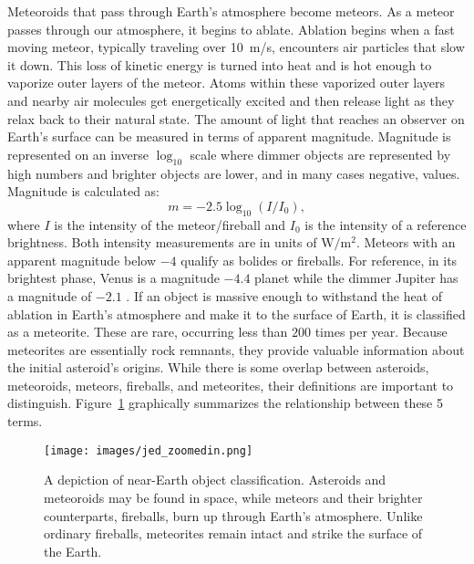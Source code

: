 Meteoroids that pass through Earth's atmosphere become meteors.
As a meteor passes through our atmosphere, it begins to ablate.
Ablation begins when a fast moving meteor, typically traveling over \SI{10}{\meter/\second}, encounters air particles that slow it down.
This loss of kinetic energy is turned into heat and is hot enough to vaporize outer layers of the meteor.  
Atoms within these vaporized outer layers and nearby air molecules get energetically excited and then release light as they relax back to their natural state.
The amount of light that reaches an observer on Earth's surface can be measured in terms of apparent magnitude.
Magnitude is represented on an inverse $\log_{10}$ scale where dimmer objects are represented by high numbers and brighter objects are lower, and in many cases negative, values.
Magnitude is calculated as:
 $$ m = -2.5 \log_{10}(I/I_0),$$
where $I$ is the intensity of the meteor/fireball and $I_0$ is the intensity of a reference brightness.  
Both intensity measurements are in units of $\si{\watt/\meter^2}$.
Meteors with an apparent magnitude below $-4$ qualify as bolides or fireballs.
For reference, in its brightest phase, Venus is a magnitude $-4.4$ planet while the dimmer Jupiter has a magnitude of $-2.1$ \cite{rao_venus_nodate}.
If an object is massive enough to withstand the heat of ablation in Earth's atmosphere and make it to the surface of Earth, it is classified as a meteorite. 
These are rare, occurring less than $200$ times per year.
Because meteorites are essentially rock remnants, they provide valuable information about the initial asteroid's origins.
While there is some overlap between asteroids, meteoroids, meteors, fireballs, and meteorites, their definitions are important to distinguish.
Figure~\ref{jed} graphically summarizes the relationship between these 5 terms.

\begin{figure}[ht!]
  \centering
  \texttt{[image: images/jed\_zoomedin.png]}
  \caption[A depiction of near-Earth object classification.]{A depiction of near-Earth object classification.  Asteroids and meteoroids may be found in space, while meteors and their brighter counterparts, fireballs, burn up through Earth's atmosphere.  Unlike ordinary fireballs, meteorites remain intact and strike the surface of the Earth.}
  \label{jed}
\end{figure}


